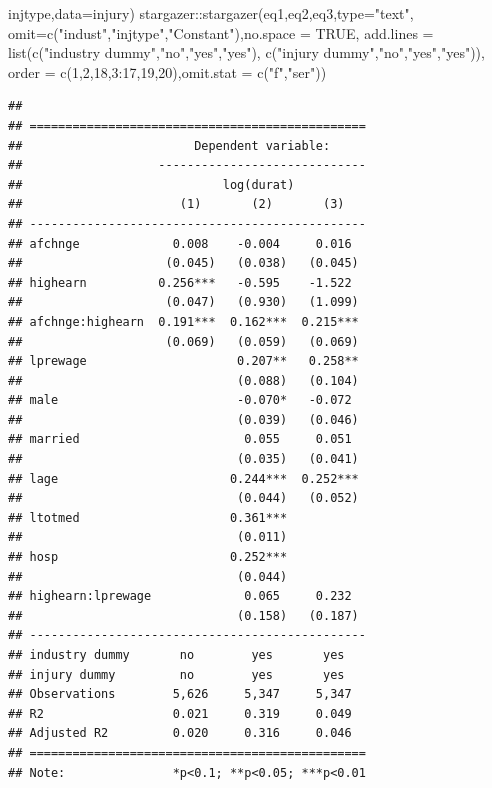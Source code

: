 \documentclass[
  12pt,
]{book}
\newenvironment{Shaded}{\begin{snugshade}}{\end{snugshade}}
\newcommand{\AttributeTok}[1]{\textcolor[rgb]{0.77,0.63,0.00}{#1}}
\newcommand{\ConstantTok}[1]{\textcolor[rgb]{0.00,0.00,0.00}{#1}}
\newcommand{\DecValTok}[1]{\textcolor[rgb]{0.00,0.00,0.81}{#1}}
\newcommand{\FunctionTok}[1]{\textcolor[rgb]{0.00,0.00,0.00}{#1}}
\newcommand{\NormalTok}[1]{#1}
\newcommand{\SpecialCharTok}[1]{\textcolor[rgb]{0.00,0.00,0.00}{#1}}
\newcommand{\StringTok}[1]{\textcolor[rgb]{0.31,0.60,0.02}{#1}}
\theoremstyle{definition}
\theoremstyle{definition}
\theoremstyle{definition}
\theoremstyle{definition}
\theoremstyle{remark}
\begin{document}
\begin{Shaded}
\begin{Highlighting}[]
\NormalTok{            injtype,}\AttributeTok{data=}\NormalTok{injury)}
\NormalTok{stargazer}\SpecialCharTok{::}\FunctionTok{stargazer}\NormalTok{(eq1,eq2,eq3,}\AttributeTok{type=}\StringTok{"text"}\NormalTok{,}
                     \AttributeTok{omit=}\FunctionTok{c}\NormalTok{(}\StringTok{"indust"}\NormalTok{,}\StringTok{"injtype"}\NormalTok{,}\StringTok{"Constant"}\NormalTok{),}\AttributeTok{no.space =} \ConstantTok{TRUE}\NormalTok{,}
                     \AttributeTok{add.lines =} \FunctionTok{list}\NormalTok{(}\FunctionTok{c}\NormalTok{(}\StringTok{"industry dummy"}\NormalTok{,}\StringTok{"no"}\NormalTok{,}\StringTok{"yes"}\NormalTok{,}\StringTok{"yes"}\NormalTok{),}
                                      \FunctionTok{c}\NormalTok{(}\StringTok{"injury dummy"}\NormalTok{,}\StringTok{"no"}\NormalTok{,}\StringTok{"yes"}\NormalTok{,}\StringTok{"yes"}\NormalTok{)),}
                     \AttributeTok{order =} \FunctionTok{c}\NormalTok{(}\DecValTok{1}\NormalTok{,}\DecValTok{2}\NormalTok{,}\DecValTok{18}\NormalTok{,}\DecValTok{3}\SpecialCharTok{:}\DecValTok{17}\NormalTok{,}\DecValTok{19}\NormalTok{,}\DecValTok{20}\NormalTok{),}\AttributeTok{omit.stat =} \FunctionTok{c}\NormalTok{(}\StringTok{"f"}\NormalTok{,}\StringTok{"ser"}\NormalTok{))}
\end{Highlighting}
\end{Shaded}

\begin{verbatim}
## 
## ===============================================
##                        Dependent variable:     
##                   -----------------------------
##                            log(durat)          
##                      (1)       (2)       (3)   
## -----------------------------------------------
## afchnge             0.008    -0.004     0.016  
##                    (0.045)   (0.038)   (0.045) 
## highearn          0.256***   -0.595    -1.522  
##                    (0.047)   (0.930)   (1.099) 
## afchnge:highearn  0.191***  0.162***  0.215*** 
##                    (0.069)   (0.059)   (0.069) 
## lprewage                     0.207**   0.258** 
##                              (0.088)   (0.104) 
## male                         -0.070*   -0.072  
##                              (0.039)   (0.046) 
## married                       0.055     0.051  
##                              (0.035)   (0.041) 
## lage                        0.244***  0.252*** 
##                              (0.044)   (0.052) 
## ltotmed                     0.361***           
##                              (0.011)           
## hosp                        0.252***           
##                              (0.044)           
## highearn:lprewage             0.065     0.232  
##                              (0.158)   (0.187) 
## -----------------------------------------------
## industry dummy       no        yes       yes   
## injury dummy         no        yes       yes   
## Observations        5,626     5,347     5,347  
## R2                  0.021     0.319     0.049  
## Adjusted R2         0.020     0.316     0.046  
## ===============================================
## Note:               *p<0.1; **p<0.05; ***p<0.01
\end{verbatim}
\end{document}
